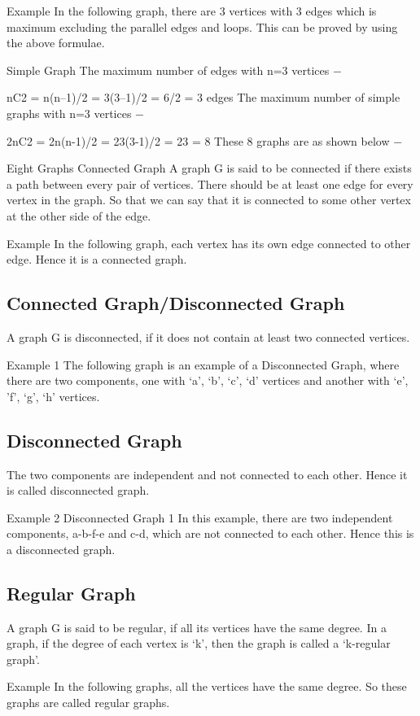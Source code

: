 Example
In the following graph, there are 3 vertices with 3 edges which is maximum excluding the parallel edges and loops. This can be proved by using the above formulae.

Simple Graph
The maximum number of edges with n=3 vertices −

nC2 = n(n–1)/2
   = 3(3–1)/2
   = 6/2
   = 3 edges
The maximum number of simple graphs with n=3 vertices −

2nC2 = 2n(n-1)/2
   = 23(3-1)/2
   = 23
   = 8
These 8 graphs are as shown below −

Eight Graphs
Connected Graph
A graph G is said to be connected if there exists a path between every pair of vertices. There should be at least one edge for every vertex in the graph. So that we can say that it is connected to some other vertex at the other side of the edge.

Example
In the following graph, each vertex has its own edge connected to other edge. Hence it is a connected graph.

\subsection{Connected Graph/Disconnected Graph}
A graph G is disconnected, if it does not contain at least two connected vertices.

Example 1
The following graph is an example of a Disconnected Graph, where there are two components, one with ‘a’, ‘b’, ‘c’, ‘d’ vertices and another with ‘e’, ’f’, ‘g’, ‘h’ vertices.

\subsection{Disconnected Graph}
The two components are independent and not connected to each other. Hence it is called disconnected graph.

Example 2
Disconnected Graph 1
In this example, there are two independent components, a-b-f-e and c-d, which are not connected to each other. Hence this is a disconnected graph.

\subsection{Regular Graph}
A graph G is said to be regular, if all its vertices have the same degree. In a graph, if the degree of each vertex is ‘k’, then the graph is called a ‘k-regular graph’.

Example
In the following graphs, all the vertices have the same degree. So these graphs are called regular graphs.

